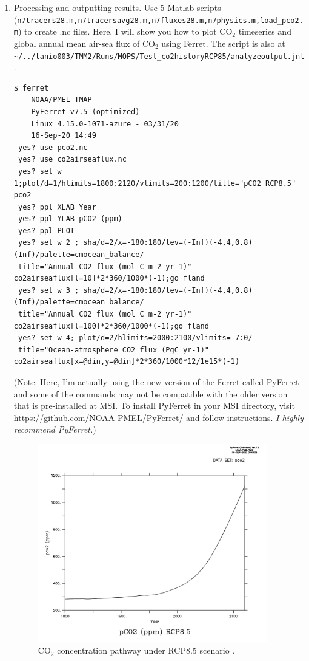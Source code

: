 \documentclass[a4paper]{article}
\begin{document}
\begin{enumerate}
\item Processing and outputting results. Use 5 Matlab scripts \\ (\verb|n7tracers28.m,n7tracersavg28.m,n7fluxes28.m,n7physics.m,load_pco2.m|) to create .nc files. Here, I will show you how to plot $\mathrm{CO_{2}}$ timeseries and global annual mean air-sea flux of $\mathrm{CO_{2}}$ using Ferret. The script is also at \verb|~/../tanio003/TMM2/Runs/MOPS/Test_co2historyRCP85/analyzeoutput.jnl|. 
\begin{lstlisting}[style=DOS]
 $ ferret
  	NOAA/PMEL TMAP
 	PyFerret v7.5 (optimized)
 	Linux 4.15.0-1071-azure - 03/31/20
 	16-Sep-20 14:49
 yes? use pco2.nc
 yes? use co2airseaflux.nc
 yes? set w 1;plot/d=1/hlimits=1800:2120/vlimits=200:1200/title="pCO2 RCP8.5" pco2
 yes? ppl XLAB Year
 yes? ppl YLAB pCO2 (ppm)
 yes? ppl PLOT
 yes? set w 2 ; sha/d=2/x=-180:180/lev=(-Inf)(-4,4,0.8)(Inf)/palette=cmocean_balance/
 title="Annual CO2 flux (mol C m-2 yr-1)" co2airseaflux[l=10]*2*360/1000*(-1);go fland
 yes? set w 3 ; sha/d=2/x=-180:180/lev=(-Inf)(-4,4,0.8)(Inf)/palette=cmocean_balance/
 title="Annual CO2 flux (mol C m-2 yr-1)" co2airseaflux[l=100]*2*360/1000*(-1);go fland
 yes? set w 4; plot/d=2/hlimits=2000:2100/vlimits=-7:0/
 title="Ocean-atmosphere CO2 flux (PgC yr-1)" co2airseaflux[x=@din,y=@din]*2*360/1000*12/1e15*(-1)
\end{lstlisting}
(Note: Here, I'm actually using the new version of the Ferret called PyFerret and some of the commands may not be compatible with the older version that is pre-installed at MSI. To install PyFerret in your MSI directory, visit \url{https://github.com/NOAA-PMEL/PyFerret/} and follow instructions. \emph{I highly recommend PyFerret.})

\begin{figure}[b!]   %
   \centering
   \includegraphics[width=10cm]{pco2RCP85.pdf}
   \caption[]{$\mathrm{CO_2}$ concentration pathway under RCP8.5 scenario \citep{Meinshausen11}.}
   \label{fig:pco2RCP85}
\end{figure}


\end{enumerate}
\end{document}
